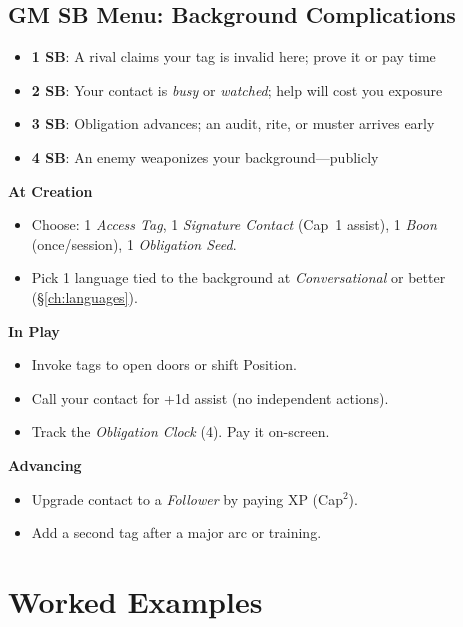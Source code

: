 \subsection*{GM SB Menu: Background Complications}
\begin{itemize}
\item \textbf{1 SB}: A rival claims your tag is invalid here; prove it or pay time
\item \textbf{2 SB}: Your contact is \emph{busy} or \emph{watched}; help will cost you exposure
\item \textbf{3 SB}: Obligation advances; an audit, rite, or muster arrives early
\item \textbf{4 SB}: An enemy weaponizes your background—publicly
\end{itemize}

\begin{tcolorbox}[colback=blue!5!white,colframe=blue!75!black,title=Background Quick Reference,fonttitle=\bfseries]
\textbf{At Creation}
\begin{itemize}
\item Choose: 1 \emph{Access Tag}, 1 \emph{Signature Contact} (Cap~1 assist), 1 \emph{Boon} (once/session), 1 \emph{Obligation Seed}.
\item Pick 1 language tied to the background at \emph{Conversational} or better (\S\ref{ch:languages}).
\end{itemize}

\textbf{In Play}
\begin{itemize}
\item Invoke tags to open doors or shift Position.
\item Call your contact for +1d assist (no independent actions).
\item Track the \emph{Obligation Clock} (4). Pay it on-screen.
\end{itemize}

\textbf{Advancing}
\begin{itemize}
\item Upgrade contact to a \emph{Follower} by paying XP (Cap$^2$).
\item Add a second tag after a major arc or training.
\end{itemize}
\end{tcolorbox}

\section{Worked Examples}

